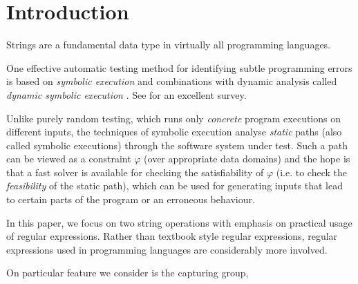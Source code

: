 
\section{Introduction}



%

Strings are a fundamental data type in virtually all programming languages.

One effective automatic testing method for identifying subtle programming errors  is based on \emph{symbolic execution}
\cite{king76} and combinations with dynamic analysis
called \emph{dynamic symbolic execution} \cite{jalangi,DART,EXE,CUTE,KLEE}.
See \cite{symbex-survey} for an excellent survey. 

Unlike purely random testing,
which runs only \emph{concrete} program executions on different
inputs, the techniques of symbolic execution analyse \emph{static} paths
(also called symbolic executions) through the software system under test.
Such a path can be viewed as a constraint $\varphi$ (over
appropriate data domains) and the hope is that a fast
solver is available for checking the satisfiability of $\varphi$ (i.e. to check
the \emph{feasibility} of the static path), which can be used for generating
inputs that lead to certain parts of the program or an erroneous behaviour.


%
In this paper, we focus on two string operations with emphasis on practical usage of  regular expressions. Rather than textbook style regular expressions, regular expressions used in programming languages are considerably more involved. 

On particular feature we consider is the capturing group, 




